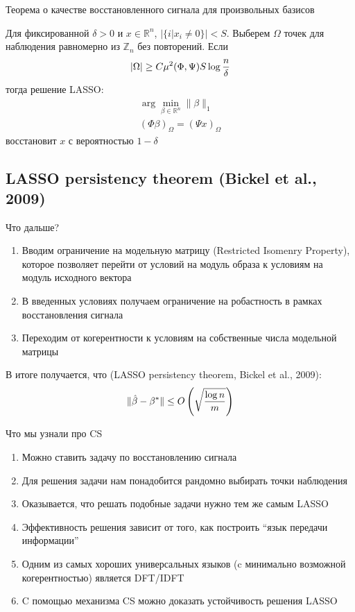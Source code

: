 \documentclass[14pt, fleqn, xcolor={dvipsnames, table}]{beamer}
\begin{document}
\begin{frame}{Теорема о качестве восстановленного сигнала для произвольных базисов}
\small
\begin{theorem}
Для фиксированной $\delta > 0$ и $x \in \mathbb{R}^n$, $|\{i | x_i \ne 0\}| < S$. Выберем $\Omega$ точек для наблюдения равномерно из $\mathbb{Z}_n$ без повторений. Если
$$|\Omega| \ge C \mu^2(\Phi,\Psi)S\log {n\over\delta}$$
тогда решение LASSO:
$$\begin{array}{l}
\arg \min_{\beta \in \mathbb{R}^n} \|\beta\|_1 \\
(\Phi \beta)_\Omega = (\Psi x)_\Omega
\end{array}$$
восстановит $x$ с вероятностью $1 - \delta$
\end{theorem}
\end{frame}

\subsection{LASSO persistency theorem (Bickel et al., 2009)}
\begin{frame}{Что дальше?}
\small
\begin{enumerate}
  \item Вводим ограничение на модельную матрицу (Restricted Isomenry Property), которое позволяет перейти от условий на модуль образа к условиям на модуль исходного вектора
  \item В введенных условиях получаем ограничение на робастность в рамках восстановления сигнала
  \item Переходим от когерентности к условиям на собственные числа модельной матрицы
\end{enumerate}
В итоге получается, что (LASSO persistency theorem, Bickel et al., 2009):
$$
\|\hat{\beta} - \beta^*\| \le O\left(\sqrt{\log n \over m}\right)
$$
\end{frame}

\begin{frame}{Что мы узнали про CS}
\small
\begin{enumerate}
  \item Можно ставить задачу по восстановлению сигнала
  \item Для решения задачи нам понадобится рандомно выбирать точки наблюдения
  \item Оказывается, что решать подобные задачи нужно тем же самым LASSO
  \item Эффективность решения зависит от того, как построить ``язык передачи информации''
  \item Одним из самых хороших универсальных языков (c минимально возможной когерентностью) является DFT/IDFT
  \item C помощью механизма CS можно доказать устойчивость решения LASSO
\end{enumerate}
\end{frame}
\end{document}
